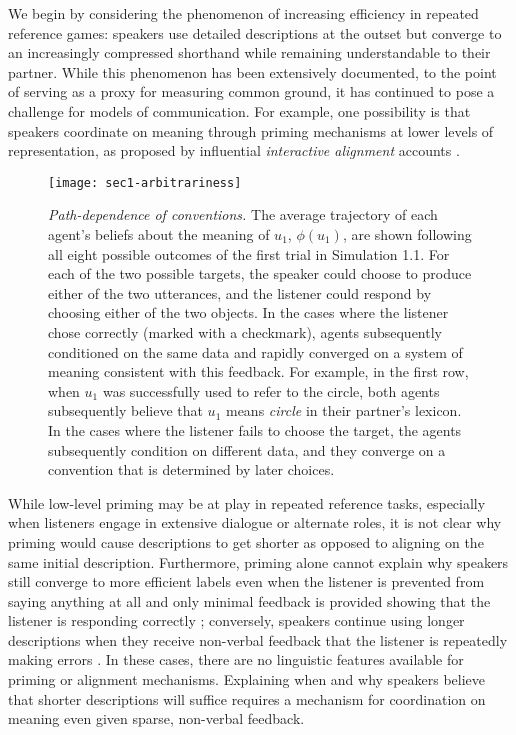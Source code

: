 We begin by considering the phenomenon of increasing efficiency in repeated reference games: speakers use detailed descriptions at the outset but converge to an increasingly compressed shorthand while remaining understandable to their partner.
While this phenomenon has been extensively documented, to the point of serving as a proxy for measuring common ground, it has continued to pose a challenge for models of communication.
For example, one possibility is that speakers coordinate on meaning through priming mechanisms at lower levels of representation, as proposed by influential  \emph{interactive alignment} accounts \cite{pickering2004toward, pickering2006alignment, garrod2009joint}.

  \begin{figure*}
\centering
    \texttt{[image: sec1-arbitrariness]}
  \caption{\emph{Path-dependence of conventions.} The average trajectory of each agent's beliefs about the meaning of $u_1$, $\phi(u_1)$, are shown following all eight possible outcomes of the first trial in Simulation 1.1. For each of the two possible targets, the speaker could choose to produce either of the two utterances, and the listener could respond by choosing either of the two objects. In the cases where the listener chose correctly (marked with a checkmark), agents subsequently conditioned on the same data and rapidly converged on a system of meaning consistent with this feedback. For example, in the first row, when $u_1$ was successfully used to refer to the circle, both agents subsequently believe that $u_1$ means \emph{circle} in their partner's lexicon. In the cases where the listener fails to choose the target, the agents subsequently condition on different data, and they converge on a convention that is determined by later choices.}
  \label{fig:path-dependence}
\end{figure*}



While low-level priming may be at play in repeated reference tasks, especially when listeners engage in extensive dialogue or alternate roles, it is not clear why priming would cause descriptions to get shorter as opposed to aligning on the same initial description.
Furthermore, priming alone cannot explain why speakers still converge to more efficient labels even when the listener is prevented from saying anything at all and only minimal feedback is provided showing that the listener is responding correctly \cite{KraussWeinheimer66_Tangrams}; conversely, speakers continue using longer descriptions when they receive non-verbal feedback that the listener is repeatedly making errors \cite<see also>{hawkins2020characterizing}.
In these cases, there are no linguistic features available for priming or alignment mechanisms.
Explaining when and why speakers believe that shorter descriptions will suffice requires a mechanism for coordination on meaning even given sparse, non-verbal feedback.


